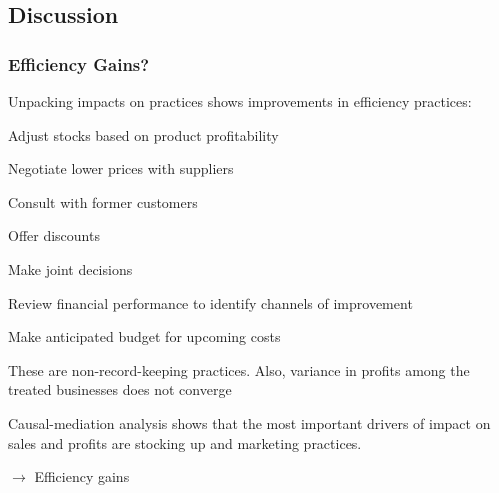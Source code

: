 \documentclass[hideothersubsections, usenames,dvipsnames,10pt]{beamer}
\newenvironment{itemize_3pt}{\itemize\addtolength{\itemsep}{3pt}}{\enditemize}
\newenvironment{enumerate_3pt}{\enumerate\addtolength{\itemsep}{3pt}}{\endenumerate}
\begin{document}
\subsection{Discussion}
\begin{frame}
\frametitle{Efficiency Gains?}
\begin{enumerate_3pt}
\item Unpacking impacts on practices shows improvements in efficiency practices:
\vspace{0.1in}
\begin{itemize_3pt}
\item Adjust stocks based on product profitability
\item Negotiate lower prices with suppliers
\item Consult with former customers
\item Offer discounts
\item Make joint decisions
\item Review financial performance to identify channels of improvement
\item Make anticipated budget for upcoming costs
\end{itemize_3pt}
\vspace{0.1in}
\pause
\item These are non-record-keeping practices. Also, variance in profits among the treated businesses does not converge
\vspace{0.1in}
\pause
\item Causal-mediation analysis shows that the most important drivers of impact on sales and profits are stocking up and marketing practices.
\end{enumerate_3pt}
\vspace{0.1in}
$\rightarrow$ \textcolor{bdf}{Efficiency gains}
\end{frame}
\end{document}
